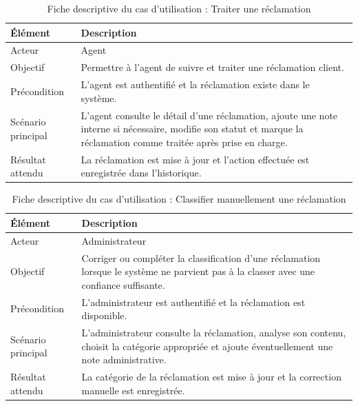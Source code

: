 \documentclass[12pt,a4paper,oneside]{report}
\begin{document}
\begin{table}[H]
\centering
\small
\renewcommand{\arraystretch}{0.9}
\caption{Fiche descriptive du cas d’utilisation : Traiter une réclamation}
\begin{tabular}{|p{4cm}|p{9cm}|}
\hline
\textbf{Élément} & \textbf{Description} \\
\hline
Acteur & Agent \\
\hline
Objectif & Permettre à l’agent de suivre et traiter une réclamation client. \\
\hline
Précondition & L’agent est authentifié et la réclamation existe dans le système. \\
\hline
Scénario principal & L’agent consulte le détail d’une réclamation, ajoute une note interne si nécessaire, modifie son statut et marque la réclamation comme traitée après prise en charge. \\
\hline
Résultat attendu & La réclamation est mise à jour et l’action effectuée est enregistrée dans l’historique. \\
\hline
\end{tabular}
\end{table}

\begin{table}[H]
\centering
\small
\caption{Fiche descriptive du cas d’utilisation : Classifier manuellement une réclamation}
\begin{tabular}{|p{4cm}|p{9cm}|}
\hline
\textbf{Élément} & \textbf{Description} \\
\hline
Acteur & Administrateur \\
\hline
Objectif & Corriger ou compléter la classification d’une réclamation lorsque le système ne parvient pas à la classer avec une confiance suffisante. \\
\hline
Précondition & L’administrateur est authentifié et la réclamation est disponible. \\
\hline
Scénario principal & L’administrateur consulte la réclamation, analyse son contenu, choisit la catégorie appropriée et ajoute éventuellement une note administrative. \\
\hline
Résultat attendu & La catégorie de la réclamation est mise à jour et la correction manuelle est enregistrée. \\
\hline
\end{tabular}
\end{table}
\end{document}

